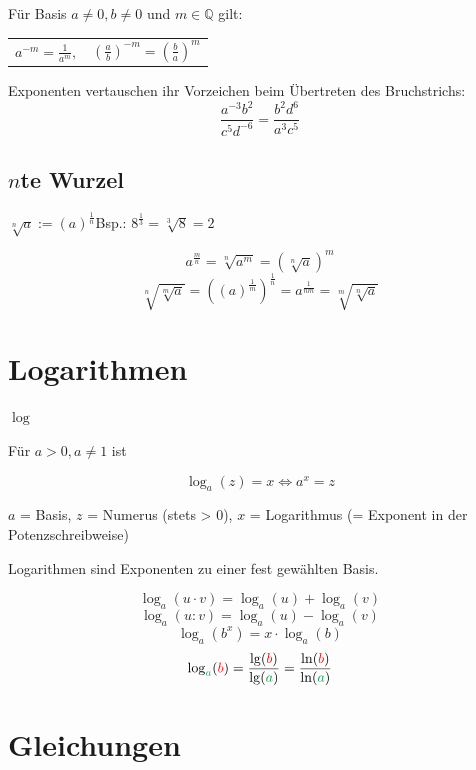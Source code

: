 \begin{multicols}{2}
Für Basis $a\ne 0, b\ne 0$ und $m \in\mathbb{Q}$ gilt:

\begin{tabular}{cc}
$a^{-m} = \frac1{a^m},$ & $\left(\frac{a}b\right)^{-m} = \left(\frac{b}a\right)^m$ \\
 \end{tabular}

\begin{rezept*}{}{}{}
Exponenten vertauschen ihr Vorzeichen beim Übertreten des Bruchstrichs:
$$\frac{a^{-3}b^2}{c^5d^{-6}} = \frac{b^2d^6}{a^3c^5}$$
\end{rezept*}

\subsection*{$n$te Wurzel}
$\sqrt[n]{a} := \left(a\right)^\frac1n$\hfill{}Bsp.: $8^{\frac13}=\sqrt[3]{8}=2$

$$a^{\frac{m}n} = \sqrt[n]{a^m} = \left(\sqrt[n]a\right)^m$$
$$\sqrt[n]{\sqrt[m]{a}}   = \left((a)^\frac1m \right)^\frac1n = a^\frac1{nm} = \sqrt[m]{\sqrt[n]{a}}  $$


\hrulefill
\section*{Logarithmen}

\begin{definition*}{$\log$}{}

Für $a>0, a\ne 1$ ist

$$\log_a{}(z)=x \Longleftrightarrow{} a^x = z$$
\end{definition*}
$a$ = Basis, $z$ = Numerus (stets > 0), $x$ = Logarithmus (= Exponent in der Potenzschreibweise)

Logarithmen sind Exponenten zu einer fest gewählten Basis.

\begin{gesetz*}{}{}
$$\log_a(u\cdot v) = \log_a(u) + \log_a(v)$$
$$\log_a(u : v) = \log_a(u) - \log_a(v)$$
$$\log_a(b^x) = x\cdot{}\log_a(b)$$
$$\log_{\color{ForestGreen}a}({\color{red}b}) = \frac{\lg({\color{red}b})}{\lg({\color{ForestGreen}a})} = \frac{\ln({\color{red}b})}{\ln({\color{ForestGreen}a})}$$
\end{gesetz*}



\hrulefill
\section*{Gleichungen}


\end{multicols}
